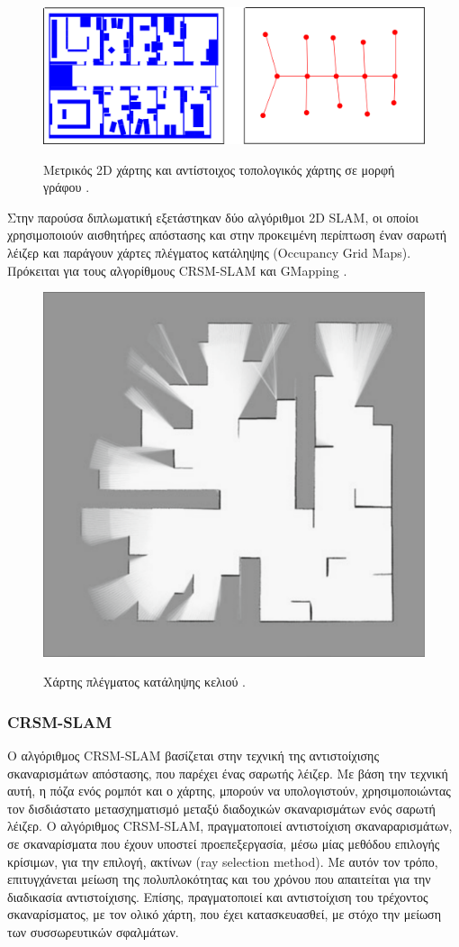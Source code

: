 \begin{figure}[!ht]
	\centering
	\includegraphics[width=0.7\linewidth]{Chapters/Chapter3/Figures/ogm_and_tm.png}
	\label{fig:ogm_and_tm}
	\caption[Μετρικός 2D χάρτης και αντίστοιχος τοπολογικός χάρτης σε μορφή γράφου.]{Μετρικός 2D χάρτης και αντίστοιχος τοπολογικός χάρτης σε μορφή γράφου \cite{probabilistic_robotics}.}
\end{figure}

\bigskip
Στην παρούσα διπλωματική εξετάστηκαν δύο αλγόριθμοι 2D SLAM, οι οποίοι χρησιμοποιούν αισθητήρες απόστασης και στην προκειμένη περίπτωση έναν {σαρωτή λέιζερ} και παράγουν χάρτες πλέγματος κατάληψης (Occupancy Grid Maps). Πρόκειται για τους αλγορίθμους CRSM-SLAM \cite{crsm} και GMapping \cite{gmapping}.

\begin{figure}[!ht]
	\centering
	\includegraphics[width=0.4\linewidth]{Chapters/Chapter3/Figures/ogm.png}
	\label{fig:ogm}
	\caption[Χάρτης πλέγματος κατάληψης κελιού.]{Χάρτης πλέγματος κατάληψης κελιού \cite{crsm}.}
\end{figure}

\bigskip
\subsubsection{CRSM-SLAM} \label{sssec:crsm_slam}
Ο αλγόριθμος CRSM-SLAM βασίζεται στην τεχνική της αντιστοίχισης σκαναρισμάτων απόστασης, που παρέχει ένας {σαρωτής λέιζερ}. Με βάση την τεχνική αυτή, η πόζα ενός ρομπότ και ο χάρτης, μπορούν να υπολογιστούν, χρησιμοποιώντας τον δισδιάστατο μετασχηματισμό μεταξύ διαδοχικών σκαναρισμάτων ενός σαρωτή λέιζερ. Ο αλγόριθμος CRSM-SLAM, πραγματοποιεί αντιστοίχιση σκαναραρισμάτων, σε σκαναρίσματα που έχουν υποστεί προεπεξεργασία, μέσω μίας μεθόδου επιλογής κρίσιμων, για την επιλογή, ακτίνων (ray selection method). Με αυτόν τον τρόπο, επιτυγχάνεται μείωση της πολυπλοκότητας και του χρόνου που απαιτείται για την διαδικασία αντιστοίχισης. Επίσης, πραγματοποιεί και αντιστοίχιση του τρέχοντος σκαναρίσματος, με τον ολικό χάρτη, που έχει κατασκευασθεί, με στόχο την μείωση των συσσωρευτικών σφαλμάτων.


